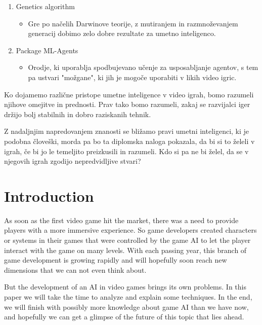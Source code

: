 \documentclass[a4paper,12pt,openright]{book}
\begin{document}
\begin{enumerate}
\begin{itemize}
        \end{itemize}
    \item Genetics algorithm
        \begin{itemize}
            \item Gre po načelih Darwinove teorije, z mutiranjem in razmnoževanjem generacij dobimo zelo dobre rezultate za umetno inteligenco.
        \end{itemize}
        \clearpage
    \item Package ML-Agents
        \begin{itemize}
            \item Orodje, ki uporablja spodbujevano učenje za usposabljanje agentov, s tem pa ustvari "možgane", ki jih je mogoče uporabiti v likih video igric.
        \end{itemize}
\end{enumerate}

Ko dojamemo različne pristope umetne inteligence v video igrah, bomo razumeli njihove omejitve in prednosti. Prav tako bomo razumeli, zakaj se razvijalci iger držijo bolj stabilnih in dobro raziskanih tehnik.

Z nadaljnjim napredovanjem znanosti se bližamo pravi umetni inteligenci, ki je podobna človeški, morda pa bo ta diplomska naloga pokazala, da bi si to želeli v igrah, če bi jo le temeljito preizkusili in razumeli. Kdo si pa ne bi želel, da se v njegovih igrah zgodijo nepredvidljive stvari?



\mainmatter
\setcounter{page}{1}
\pagestyle{fancy}

\chapter{Introduction}

As soon as the first video game hit the market, there was a need to provide players with a more immersive experience. So game developers created characters or systems in their games that were controlled by the game AI to let the player interact with the game on many levels. With each passing year, this branch of game development is growing rapidly and will hopefully soon reach new dimensions that we can not even think about.

But the development of an AI in video games brings its own problems. In this paper we will take the time to analyze and explain some techniques. In the end, we will finish with possibly more knowledge about game AI than we have now, and hopefully we can get a glimpse of the future of this topic that lies ahead.
\end{document}
